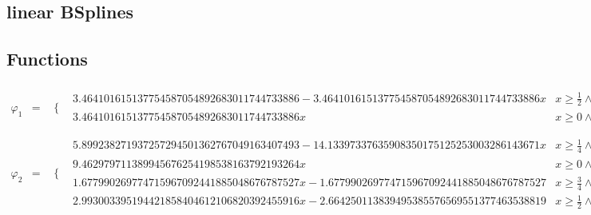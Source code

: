 \documentclass{article}
\begin{document}
 

\begin{landscape}
\section{linear BSplines}
\subsection{Functions}\begin{eqnarray*} \varphi_1 & = & \begin{array}{cc}
 \{ & 
\begin{array}{cc}
 3.464101615137754587054892683011744733886-3.464101615137754587054892683011744733886 x & x\geq \frac{1}{2}\land x<1 \\
 3.464101615137754587054892683011744733886 x & x\geq 0\land x<\frac{1}{2}
\end{array}

\end{array}\\
\varphi_2 & = & \begin{array}{cc}
 \{ & 
\begin{array}{cc}
 5.899238271937257294501362767049163407493-14.13397337635908350175125253003286143671 x & x\geq \frac{1}{4}\land x<\frac{1}{2} \\
 9.462979711389945676254198538163792193264 x & x\geq 0\land x<\frac{1}{4} \\
 1.677990269774715967092441885048676787527 x-1.677990269774715967092441885048676787527 & x\geq \frac{3}{4}\land x<1 \\
 2.993003395194421858404612106820392455916 x-2.664250113839495385576569551377463538819 & x\geq \frac{1}{2}\land x<\frac{3}{4}
\end{array}


\end{array}
\end{eqnarray*}
\end{landscape}
\end{document}
